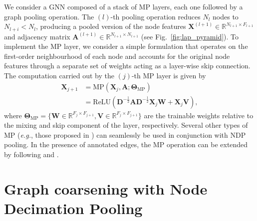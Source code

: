 \documentclass[journal]{IEEEtran}
\def\X{{\mathbf X}}
\def\W{{\mathbf W}}
\def\A{{\mathbf A}}
\def\D{{\mathbf D}}
\begin{document}
We consider a GNN composed of a stack of MP layers, each one followed by a graph pooling operation.
The $(l)$-th pooling operation reduces $N_{l}$ nodes to $N_{l+i} < N_l$, producing a pooled version of the node features $\X^{(l+1)} \in \mathbb{R}^{N_{l+1} \times F_{l+1}}$ and adjacency matrix $\A^{(l+1)} \in \mathbb{R}^{N_{l+1} \times N_{l+1}}$ (see Fig.~\ref{fig:lap_pyramid}).
To implement the MP layer, we consider a simple formulation that operates on the first-order neighbourhood of each node and accounts for the original node features through a separate set of weights acting as a layer-wise skip connection. 
The computation carried out by the $(j)$-th MP layer is given by
\begin{equation}
    \label{eq:mp}
    \begin{aligned}
    \X_{j+1} & = \textrm{MP}(\X_j, \A; \boldsymbol{\Theta}_{\textrm{MP}}) \\
             & = \text{ReLU}(\D^{-\frac{1}{2}} \A \D^{-\frac{1}{2}} \X_j \W + \X_j \mathbf{V}),
    \end{aligned}
\end{equation}
where $\boldsymbol{\Theta}_{\textrm{MP}} = \{\W \in \mathbb{R}^{F_j \times F_{j+1}}, \mathbf{V} \in \mathbb{R}^{F_j \times F_{j+1}} \}$ are the trainable weights relative to the mixing and skip component of the layer, respectively. 
Several other types of MP (\textit{e.g.}, those proposed in \cite{defferrard2016convolutional, kipf2016semi, velickovic2017graph, bianchi2019graph, xu2018powerful, hamilton2017inductive}) can seamlessly be used in conjunction with NDP pooling.
In the presence of annotated edges, the MP operation can be extended by following \cite{simonovsky2017dynamic} and \cite{schlichtkrull2018modeling}.

\section{Graph coarsening with Node Decimation Pooling}
\label{sec:method}
\end{document}
